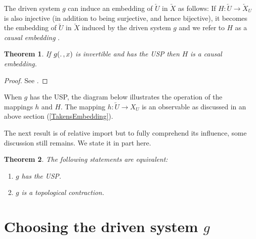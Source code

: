 \documentclass[a4paper,12pt,twoside]{report}
\newtheorem{Theorem}{Theorem}[]
\begin{document}
The driven system $g$ can induce an embedding of $\overleftarrow{U}$ in $\overleftarrow{X}$ as follows: 
If $H:\overleftarrow{U}{\to}{\overleftarrow{X}_U}$ is also injective (in addition to being surjective, and hence bijective), 
it becomes the embedding of $\overleftarrow{U}$ in $\overleftarrow{X}$ induced by the driven system $g$ and we refer to $H$ as a \emph{causal embedding} 
. 

\begin{Theorem}
 If $g(\ldotp,x)$ is invertible and has the USP then $H$ is a causal embedding. 
\end{Theorem}
\begin{proof}
  See \cite{manjunath2021universal}.
\end{proof}

When $g$ has the USP, the diagram below illustrates the operation of the mappings $h$ and $H$. The mapping $h:\overleftarrow{U}\to{X_U}$ is an observable as discussed in an above section (\ref{TakensEmbedding}).  

\begin{figure}[ht]
  \centering
  \label{fig:actionh_H}
\end{figure}

The next result is of relative import but to fully comprehend its influence, some discussion still remains. We state it in part here.

\begin{Theorem}
  The following statements are equivalent:
  \vspace{-8mm}
  \begin{enumerate}[noitemsep, label=\roman*.]
    \item $g$ has the USP. 
    \item $g$ is a topological contraction.
  \end{enumerate}
\end{Theorem}


\section{Choosing the driven system $g$}
\end{document}
